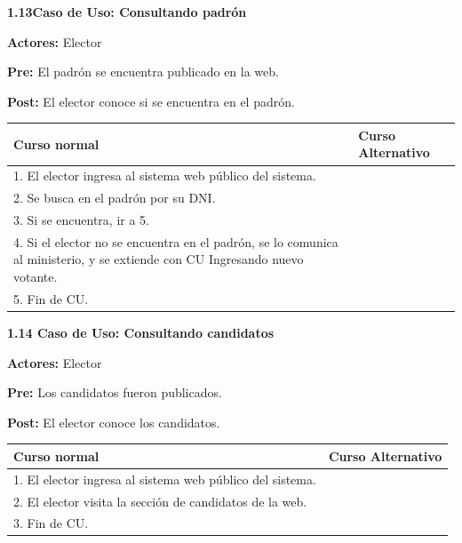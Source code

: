 \newpage

\textbf{1.13Caso de Uso:  Consultando padrón}

\textbf{Actores:} Elector 

\textbf{Pre:} El padrón se encuentra publicado en la web. 

\textbf{Post:}  El elector conoce si se encuentra en el padrón.


\begin{table}[h!]
	
 \begin{tabular}{|p{7.5cm} | p{7.5cm}|} 
 \hline
 \textbf{Curso normal} & \textbf{Curso Alternativo} \\
 \hline

1. El elector ingresa al sistema web público del sistema. & \\
 \hline



2. Se busca en el padrón por su DNI. & \\
 \hline



3. Si se encuentra, ir a 5. & \\
 \hline



4. Si el elector no se encuentra en el padrón, se lo comunica al ministerio, y se extiende con CU Ingresando nuevo votante. & \\
 \hline



5. Fin de CU. & \\
 \hline


 \end{tabular}

\end{table}


	

\textbf{1.14 Caso de Uso: Consultando candidatos}

\textbf{Actores:} Elector 

\textbf{Pre:} Los candidatos fueron publicados.

\textbf{Post:}  El elector conoce los candidatos.
\begin{table}[h!]
	
 \begin{tabular}{|p{7.5cm} | p{7.5cm}|} 
 \hline
 \textbf{Curso normal} & \textbf{Curso Alternativo} \\
 \hline
 
1. El elector ingresa al sistema web público del sistema. & \\
 \hline



2. El elector visita la sección de candidatos de la web. & \\
 \hline


3. Fin de CU. & \\
 \hline


 \end{tabular}

\end{table}


